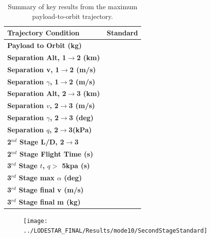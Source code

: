 \begin{table}[ht]
	\centering
	\begin{tabular}{l c } 
		\hline \textbf{Trajectory Condition}
		&Standard

		\\
		\hline \textbf{Payload to Orbit (kg)}
		& \PayloadToOrbitStandardNoReturn
		\\
		\textbf{Separation Alt, 1$\rightarrow$2 (km)}
		& \firstsecondSeparationAltStandardNoReturn
		\\
		\textbf{Separation v, 1$\rightarrow$2 (m/s)}
		& \firstsecondSeparationvStandardNoReturn
		\\
		\textbf{Separation $\gamma$, 1$\rightarrow$2 (m/s)}
		& \firstsecondSeparationgammaStandardNoReturn
		\\
		\textbf{Separation Alt, 2$\rightarrow$3 (km)}
		& \secondthirdSeparationAltStandardNoReturn
		\\
		\textbf{Separation $v$, 2$\rightarrow$3 (m/s)}
		& \secondthirdSeparationvStandardNoReturn
		\\
		\textbf{Separation $\gamma$, 2$\rightarrow$3 (deg)}
		& \secondthirdSeparationgammaStandardNoReturn
		\\
		\textbf{Separation $q$, 2$\rightarrow$3(kPa)}
		& \secondthirdSeparationqStandardNoReturn
		\\
		\textbf{2$^{nd}$ Stage L/D, 2$\rightarrow$3}
		& \secondthirdSeparationLDStandardNoReturn
		\\
		\textbf{2$^{nd}$ Stage Flight Time (s)}
		& \secondFlightTimeStandardNoReturn
		\\
		\textbf{3$^{rd}$ Stage $t$, $q >$ 5kpa (s)}
		& \thirdqOverFiveStandardNoReturn
		\\
		\textbf{3$^{rd}$ Stage max $\alpha$ (deg)}
		& \thirdmaxAoAStandardNoReturn
		\\
		\textbf{3$^{rd}$ Stage final v (m/s)}
		& \thirdcircvStandardNoReturn
		\\
		\textbf{3$^{rd}$ Stage final m (kg)}
		& \thirdcircmStandardNoReturn
		\\
		\hline 
	\end{tabular} 
	\caption{Summary of key results from the maximum payload-to-orbit trajectory.}
	\label{tab:summaryStandardNoReturn}
\end{table}







\begin{figure}[ht!]
\centering
\texttt{[image: ../LODESTAR\_FINAL/Results/mode10/SecondStageStandard]}
\caption{}
\label{fig:SecondStageStandardNoReturn}
\end{figure}



